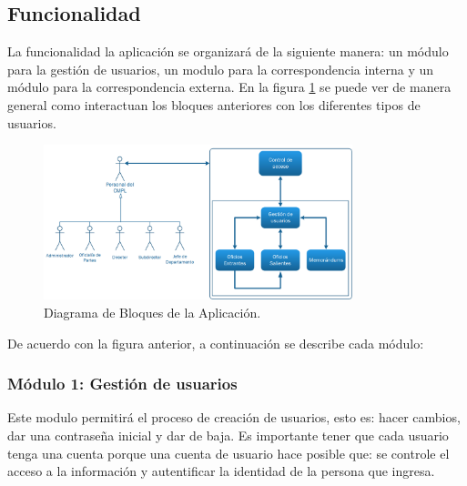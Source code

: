 
\subsection{Funcionalidad}

La funcionalidad la aplicación se organizará de la siguiente manera: un módulo para la gestión de usuarios, un modulo para la correspondencia interna y un módulo para la correspondencia externa. En la figura \ref{diagrama a bloques} se puede ver de manera general como interactuan los bloques anteriores con los diferentes tipos de usuarios.\\

	\begin{figure}[htbp!]
		\centering
			\includegraphics[width=0.8\textwidth]{images/propuesta/diagramabloques}
		\caption{Diagrama de Bloques de la Aplicación.}
		\label{diagrama a bloques}
	\end{figure}

De acuerdo con la figura anterior, a continuación se describe cada módulo:

\subsubsection{Módulo 1: Gestión de usuarios}
Este modulo permitirá el proceso de creación de usuarios, esto es: hacer cambios, dar una contraseña inicial y dar de baja. Es importante tener que cada usuario tenga una cuenta porque una cuenta de usuario hace posible que: se controle el acceso a la información y autentificar la identidad de la persona que ingresa. \\

